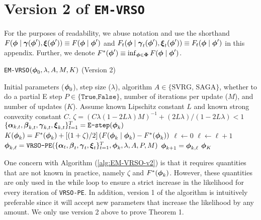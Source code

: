 \section{Version 2 of \texttt{EM-VRSO}}

For the purposes of readability, we abuse notation and use the shorthand $F(\boldsymbol{\phi} \mid \boldsymbol{\gamma}(\boldsymbol{\phi}'), \boldsymbol{\xi}(\boldsymbol{\phi}')) \equiv F(\boldsymbol{\phi} \mid \boldsymbol{\phi}')$ and $F_{t}(\boldsymbol{\phi} \mid \boldsymbol{\gamma}_{t}(\boldsymbol{\phi}'), \boldsymbol{\xi}_{t}(\boldsymbol{\phi}')) \equiv F_{t}(\boldsymbol{\phi} \mid \boldsymbol{\phi}')$ in this appendix. Further, we denote $F^*(\boldsymbol{\phi}') \equiv \inf_{\boldsymbol{\phi} \in \boldsymbol{\Phi}} F(\boldsymbol{\phi} \mid \boldsymbol{\phi}')$.

\begin{algorithm}
\caption{\texttt{EM-VRSO}$(\boldsymbol{\phi}_0, \lambda, A, M, K)$ (Version 2)}\label{alg:EM-VRSO-v2}
\begin{algorithmic}[1]
\Require Initial parameters ($\boldsymbol{\phi}_{0}$), step size ($\lambda$), algorithm $A \in \{\text{SVRG, SAGA}\}$, whether to do a partial E step $P \in \{\texttt{True,False}\}$, number of iterations per update ($M$), and number of updates ($K$). Assume known Lipschitz constant $L$ and known strong convexity constant $C$.
%
\vspace{5pt}
%
\State $\zeta = (C \lambda(1-2L\lambda)M)^{-1} + (2L\lambda) / (1-2L\lambda) < 1$ 
%
%
% 
\State $\{\boldsymbol{\alpha}_{k,t},\boldsymbol{\beta}_{k,t},\boldsymbol{\gamma}_{k,t},\boldsymbol{\xi}_{k,t}\}_{t=1}^{T} = \texttt{E-step}(\boldsymbol{\phi}_{k})$ 
%
\State $K(\boldsymbol{\phi}_{k}) = F^{*}(\boldsymbol{\phi}_{k}) + \left[(1 + \zeta) / 2\right]\left(F(\boldsymbol{\phi}_{k} \mid \boldsymbol{\phi}_{k}) - F^{*}(\boldsymbol{\phi}_{k})\right)$
%
\State $\ell \gets 0$ 
%
\State $\ell \gets \ell+1$
\State $\boldsymbol{\phi}_{k,\ell} = \texttt{VRSO-PE}(\{\boldsymbol{\alpha}_t,\boldsymbol{\beta}_t,\boldsymbol{\gamma}_t,\boldsymbol{\xi}_t\}_{t=1}^{T},\boldsymbol{\phi}_{k},\lambda,A,P,M)$
%
\EndWhile
\State $\boldsymbol{\phi}_{k+1} = \boldsymbol{\phi}_{k,\ell}$
\EndFor
\State \Return $\boldsymbol{\phi}_K$
\end{algorithmic}
\end{algorithm}

One concern with Algorithm (\ref{alg:EM-VRSO-v2}) is that it requires quantities that are not known in practice, namely $\zeta$ and $F^{*}(\boldsymbol{\phi}_{k})$. However, these quantities are only used in the while loop to ensure a strict increase in the likelihood for every iteration of \texttt{VRSO-PE}. In addition, version 1 of the algorithm is intuitively preferable since it will accept new parameters that increase the likelihood by any amount. We only use version 2 above to prove Theorem 1.

